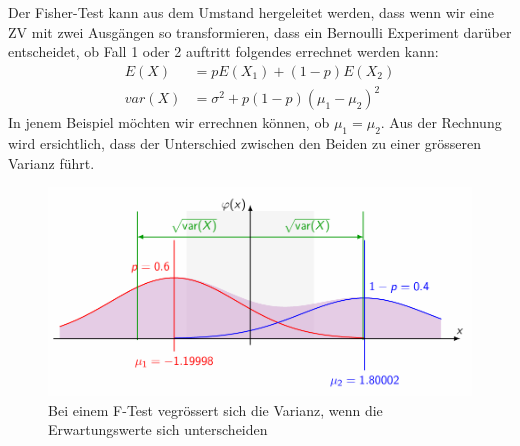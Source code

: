 \documentclass[../Main.tex]{subfiles}
\begin{document}
Der Fisher-Test kann aus dem Umstand hergeleitet werden,
dass wenn wir eine ZV mit zwei Ausgängen so transformieren,
dass ein Bernoulli Experiment darüber entscheidet, ob Fall 1 oder 2 auftritt folgendes
errechnet werden kann:
\begin{equation*}
    \begin{split}
        E(X) &= p E(X_1) + (1-p) E(X_2) \\
        var(X) &= \sigma^2 + p(1-p)(\mu_1 - \mu_2)^2
    \end{split}
\end{equation*}
In jenem Beispiel möchten wir errechnen können, ob \(\mu_1 = \mu_2\).
Aus der Rechnung wird ersichtlich, dass der Unterschied zwischen den Beiden zu einer grösseren Varianz führt.

\begin{figure}[H]
    \centering
    \includegraphics[width=0.75\linewidth]{Images/f-test-verteilung.png}
    \caption{Bei einem F-Test vegrössert sich die Varianz, wenn die Erwartungswerte sich unterscheiden}
\end{figure}

\end{document}
